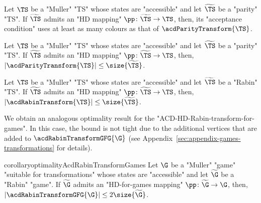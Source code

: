 \documentclass[10pt,a4paper]{amsart}
\renewcommand{\P}{\mathcal{P}}
\begin{document}
\begin{theorem}\label{thm-acd:optimality-priorities_ACD-parity_transform}
	Let $\TS$ be a  "Muller" "TS" whose states are "accessible" and let $\widetilde{\TS}$ be a  "parity" "TS". If $\widetilde{\TS}$ admits an "HD mapping" $\pp\colon \widetilde{\TS} \to \TS$, then, its "acceptance condition" uses at least as many colours as that of $\acdParityTransform{\TS}$.
\end{theorem}


\begin{theorem}\label{thm-acd:optimality-size_ACD-parity_transform}
	Let $\TS$ be a  "Muller" "TS" whose states are "accessible" and let $\widetilde{\TS}$ be a  "parity" "TS". If $\widetilde{\TS}$ admits an "HD mapping" $\pp\colon \widetilde{\TS} \to \TS$, then, 
	$|\acdParityTransform{\TS}| \leq \size{\widetilde{\TS}}$.
\end{theorem}

\begin{theorem}\label{thm-acd:optimality_ACD-HD-Rabin-transform}
	Let $\TS$ be a  "Muller" "TS" whose states are "accessible" and let $\widetilde{\TS}$ be a  "Rabin" "TS". If $\widetilde{\TS}$ admits an "HD mapping" $\pp\colon \widetilde{\TS} \to \TS$, then,
	$|\acdRabinTransform{\TS}| \leq \size{\widetilde{\TS}}$.
\end{theorem}


We obtain an analogous optimality result for the "ACD-HD-Rabin-transform-for-games". In this case, the bound is not tight due to the additional vertices that are added to $\acdRabinTransformGFG{\G}$ (see Appendix~\ref{sec:appendix-games-transformations} for details).
\begin{restatable}{corollary}{optimalityAcdRabinTransformGames}
	Let $\G$ be a "Muller" "game" "suitable for transformations" whose states are "accessible" and let $\widetilde{\G}$ be a  "Rabin" "game". If $\widetilde{\G}$ admits an "HD-for-games mapping" $\pp\colon \widetilde{\G} \to \G$, then,
	$|\acdRabinTransformGFG{\G}| \leq 2\size{\widetilde{\G}}$.
\end{restatable}

\end{document}
